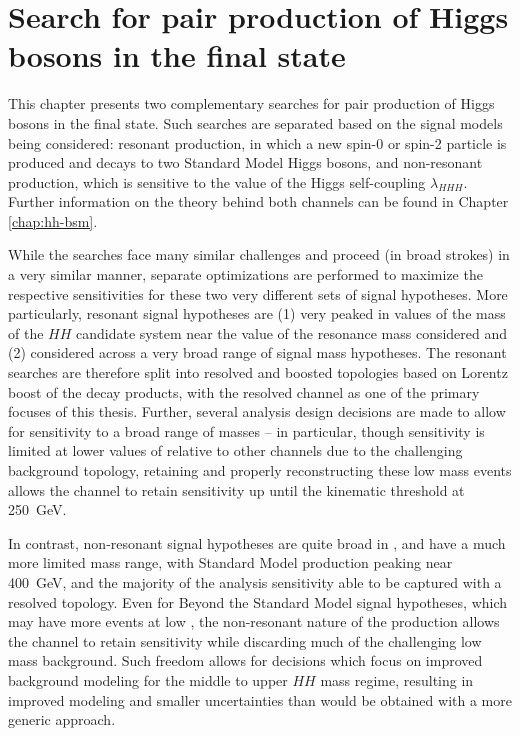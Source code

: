 \chapter{Search for pair production of Higgs bosons in the \bbbb final state}
\label{chap:bbbb}

This chapter presents two complementary searches for pair production of 
Higgs bosons in the final state. Such searches are separated based on the 
signal models being considered: resonant production, in which a new spin-0 or 
spin-2 particle is produced and decays to two Standard Model Higgs bosons, and 
non-resonant production, which is sensitive to the value of the Higgs self-coupling
$\lambda_{HHH}$. Further information on the theory behind both channels can be 
found in Chapter \ref{chap:hh-bsm}.

While the searches face many similar challenges and proceed (in broad strokes) in a very 
similar manner, separate optimizations are performed to maximize the respective sensitivities 
for these two very different sets of signal hypotheses. More particularly, resonant signal 
hypotheses are (1) very peaked in values of the mass of the $HH$ candidate system near the 
value of the resonance mass considered and (2) considered across a very broad range of 
signal mass hypotheses. The resonant searches are therefore split into resolved and boosted 
topologies based on Lorentz boost of the decay products, with the resolved channel as one of the 
primary focuses of this thesis. Further, several analysis design decisions are made to 
allow for sensitivity to a broad range of masses -- in particular, though sensitivity is 
limited at lower values of \mhh relative to other channels  due to 
the challenging background topology, retaining and properly reconstructing these low mass events 
allows the \bbbb channel to retain sensitivity up until the kinematic threshold at \SI{250}{\GeV}.

In contrast, non-resonant signal hypotheses are quite broad in \mhh, and have a much more limited 
mass range, with Standard Model production peaking near \SI{400}{GeV}, and the majority of the analysis 
sensitivity able to be captured with a resolved topology. Even for Beyond the Standard 
Model signal hypotheses, which may have more events at low \mhh, the non-resonant nature of the
production allows the \bbbb channel to retain sensitivity while discarding much of the challenging 
low mass background. Such freedom allows for decisions which focus on improved background modeling 
for the middle to upper $HH$ mass regime, resulting in improved modeling and smaller uncertainties 
than would be obtained with a more generic approach.

